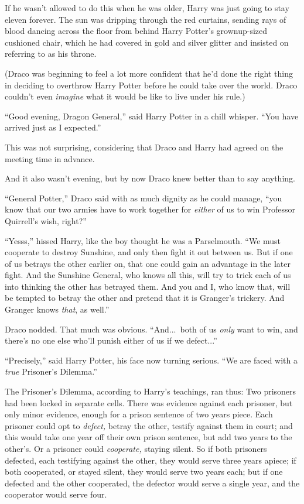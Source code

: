 If he wasn’t allowed to do this when he was older, Harry was just going to stay eleven forever.
\sbreak
The sun was dripping through the red curtains, sending rays of blood dancing across the floor from behind Harry Potter’s grownup-sized cushioned chair, which he had covered in gold and silver glitter and insisted on referring to as his throne.

(Draco was beginning to feel a lot more confident that he’d done the right thing in deciding to overthrow Harry Potter before he could take over the world. Draco couldn’t even \emph{imagine} what it would be like to live under his rule.)

“Good evening, Dragon General,” said Harry Potter in a chill whisper. “You have arrived just as I expected.”

This was not surprising, considering that Draco and Harry had agreed on the meeting time in advance.

And it also wasn’t evening, but by now Draco knew better than to say anything.

“General Potter,” Draco said with as much dignity as he could manage, “you know that our two armies have to work together for \emph{either} of us to win Professor Quirrell’s wish, right?”

“Yesss,” hissed Harry, like the boy thought he was a Parselmouth. “We must cooperate to destroy Sunshine, and only then fight it out between us. But if one of us betrays the other earlier on, that one could gain an advantage in the later fight. And the Sunshine General, who knows all this, will try to trick each of us into thinking the other has betrayed them. And you and I, who know that, will be tempted to betray the other and pretend that it is Granger’s trickery. And Granger knows \emph{that}, as well.”

Draco nodded. That much was obvious. “And...\ both of us \emph{only} want to win, and there’s no one else who’ll punish either of us if we defect...”

“Precisely,” said Harry Potter, his face now turning serious. “We are faced with a \emph{true} Prisoner’s Dilemma.”

The Prisoner’s Dilemma, according to Harry’s teachings, ran thus: Two prisoners had been locked in separate cells. There was evidence against each prisoner, but only minor evidence, enough for a prison sentence of two years piece. Each prisoner could opt to \emph{defect,} betray the other, testify against them in court; and this would take one year off their own prison sentence, but add two years to the other’s. Or a prisoner could \emph{cooperate,} staying silent. So if both prisoners defected, each testifying against the other, they would serve three years apiece; if both cooperated, or stayed silent, they would serve two years each; but if one defected and the other cooperated, the defector would serve a single year, and the cooperator would serve four.

